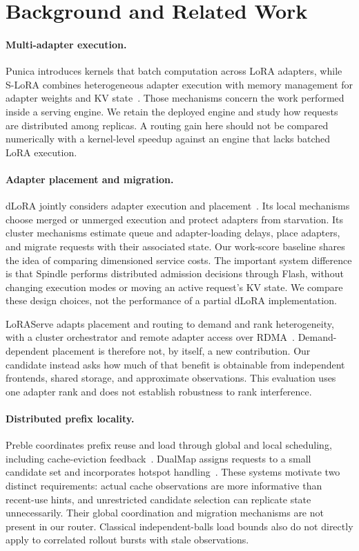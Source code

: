 \documentclass[10pt,twocolumn,letterpaper]{article}
\begin{document}
\section{Background and Related Work}
\paragraph{Multi-adapter execution.}
Punica introduces kernels that batch computation across LoRA adapters, while
S-LoRA combines heterogeneous adapter execution with memory management for
adapter weights and KV state~\cite{punica,slora}. Those mechanisms concern the
work performed inside a serving engine. We retain the deployed engine and study
how requests are distributed among replicas. A routing gain here should not be
compared numerically with a kernel-level speedup against an engine that lacks
batched LoRA execution.

\paragraph{Adapter placement and migration.}
dLoRA jointly considers adapter execution and placement~\cite{dlora}. Its local
mechanisms choose merged or unmerged execution and protect adapters from
starvation. Its cluster mechanisms estimate queue and adapter-loading delays,
place adapters, and migrate requests with their associated state. Our work-score
baseline shares the idea of comparing dimensioned service costs. The important
system difference is that Spindle performs distributed admission decisions
through Flash, without changing execution modes or moving an active request's KV
state. We compare these design choices, not the performance of a partial dLoRA
implementation.

LoRAServe adapts placement and routing to demand and rank heterogeneity, with a
cluster orchestrator and remote adapter access over RDMA~\cite{loraserve}.
Demand-dependent placement is therefore not, by itself, a new contribution.
Our candidate instead asks how much of that benefit is obtainable from independent
frontends, shared storage, and approximate observations. This evaluation uses one
adapter rank and does not establish robustness to rank interference.

\paragraph{Distributed prefix locality.}
Preble coordinates prefix reuse and load through global and local scheduling,
including cache-eviction feedback~\cite{preble}. DualMap assigns requests to a
small candidate set and incorporates hotspot handling~\cite{dualmap}. These
systems motivate two distinct requirements: actual cache observations are more
informative than recent-use hints, and unrestricted candidate selection can
replicate state unnecessarily. Their global coordination and migration mechanisms
are not present in our router. Classical independent-balls load bounds also do
not directly apply to correlated rollout bursts with stale observations.
\end{document}

